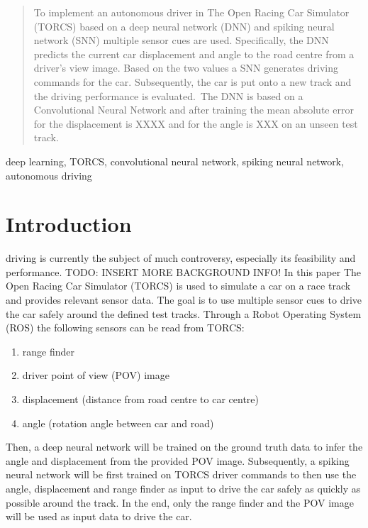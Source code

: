\documentclass[10pt,a4paper,twoside,journal]{IEEEtran}
\begin{document}
\begin{abstract}
	To implement an autonomous driver in The Open Racing Car Simulator (TORCS)
	based on a deep neural network (DNN) and spiking neural network (SNN) multiple
	sensor cues are used. Specifically, the DNN predicts the current car displacement
	and angle to the road centre from a driver's view image. Based on the two values
	a SNN generates driving commands for the car. Subsequently, the car is put onto a 
	new track and the driving performance is evaluated.\
	The DNN is based on a Convolutional Neural Network and after training the mean 
	absolute error for the displacement is XXXX and for the angle is XXX on an
	unseen test track.
\end{abstract}

\begin{IEEEkeywords}
	deep learning, TORCS, convolutional neural network, spiking neural network, autonomous driving
\end{IEEEkeywords}

%
%
\section{Introduction}
\label{sc:intro}

 driving is currently the subject of much controversy, especially
its feasibility and performance. TODO: INSERT MORE BACKGROUND INFO! 
In this paper The Open Racing Car Simulator (TORCS) is used
to simulate a car on a race track and provides relevant sensor data. The goal is to use multiple sensor cues to drive the car safely around the defined test tracks. Through a Robot Operating System (ROS) the following sensors can be read from TORCS: 
\begin{enumerate}
	\item range finder
	\item driver point of view (POV) image
	\item displacement (distance from road centre to car centre)
	\item angle (rotation angle between car and road)
\end{enumerate}
Then, a deep neural network will be trained on the ground truth data to infer the angle and displacement from the provided POV image. Subsequently, a spiking neural network will be first trained on TORCS driver commands to then use the angle, displacement and range finder as input to drive the car safely as quickly as possible around the track. In the end, only the range finder and the POV image will be used as input data to drive the car.
\end{document}
